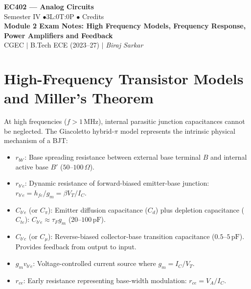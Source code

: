 \documentclass[12pt,a4paper]{article}
\begin{document}
\begin{center}
  {\LARGE\bfseries\color{myred} EC402 --- Analog Circuits}\\[5pt]
  {\normalsize\color{mydark} Semester IV \quad$\bullet$\quad 3L:0T:0P \quad$\bullet$ Credits}\\[3pt]
  {\normalsize\color{myteal}\textbf{Module 2 Exam Notes: High Frequency Models, Frequency Response, Power Amplifiers and Feedback}}\\[3pt]
  {\small\color{mydark} CGEC \;$|$\; B.Tech ECE (2023--27) \;$|$\; \textit{Biraj Sarkar}}
\end{center}
\vspace{2pt}
\noindent{\color{myred}\rule{\linewidth}{1.5pt}}
\vspace{2pt}

\hypersetup{linkcolor=mydark}
\tableofcontents
\hypersetup{linkcolor=myteal}
\newpage

\section{High-Frequency Transistor Models and Miller's Theorem}

\begin{tcolorbox}[defbox, title={High-Frequency Hybrid-$\pi$ (Giacoletto) Model}]
At high frequencies ($f > 1\,\mathrm{MHz}$), internal parasitic junction capacitances cannot be neglected. The Giacoletto hybrid-$\pi$ model represents the intrinsic physical mechanism of a BJT:
\begin{itemize}[leftmargin=1.5em, itemsep=2pt]
  \item $r_{bb'}$: Base spreading resistance between external base terminal $B$ and internal active base $B'$ ($50$--$100\,\Omega$).
  \item $r_{b'e}$: Dynamic resistance of forward-biased emitter-base junction: $r_{b'e} = h_{fe} / g_m = \beta V_T / I_C$.
  \item $C_{b'e}$ (or $C_\pi$): Emitter diffusion capacitance ($C_d$) plus depletion capacitance ($C_{te}$): $C_{b'e} \approx \tau_F g_m$ ($20$--$100\,\mathrm{pF}$).
  \item $C_{b'c}$ (or $C_\mu$): Reverse-biased collector-base transition capacitance ($0.5$--$5\,\mathrm{pF}$). Provides feedback from output to input.
  \item $g_m v_{b'e}$: Voltage-controlled current source where $g_m = I_C/V_T$.
  \item $r_{ce}$: Early resistance representing base-width modulation: $r_{ce} = V_A / I_C$.
\end{itemize}
\end{tcolorbox}
\end{document}
